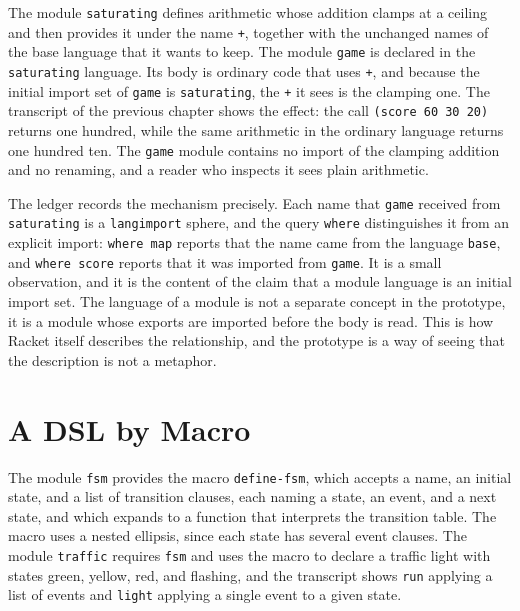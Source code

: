 The module \texttt{saturating} defines arithmetic whose addition clamps at a ceiling and then provides it under the name \texttt{+}, together with the unchanged names of the base language that it wants to keep. The module \texttt{game} is declared in the \texttt{saturating} language. Its body is ordinary code that uses \texttt{+}, and because the initial import set of \texttt{game} is \texttt{saturating}, the \texttt{+} it sees is the clamping one. The transcript of the previous chapter shows the effect: the call \texttt{(score 60 30 20)} returns one hundred, while the same arithmetic in the ordinary language returns one hundred ten. The \texttt{game} module contains no import of the clamping addition and no renaming, and a reader who inspects it sees plain arithmetic.

The ledger records the mechanism precisely. Each name that \texttt{game} received from \texttt{saturating} is a \texttt{langimport} sphere, and the query \texttt{where} distinguishes it from an explicit import: \texttt{where map} reports that the name came from the language \texttt{base}, and \texttt{where score} reports that it was imported from \texttt{game}. It is a small observation, and it is the content of the claim that a module language is an initial import set. The language of a module is not a separate concept in the prototype, it is a module whose exports are imported before the body is read. This is how Racket itself describes the relationship, and the prototype is a way of seeing that the description is not a metaphor.

\section{A DSL by Macro}

The module \texttt{fsm} provides the macro \texttt{define-fsm}, which accepts a name, an initial state, and a list of transition clauses, each naming a state, an event, and a next state, and which expands to a function that interprets the transition table. The macro uses a nested ellipsis, since each state has several event clauses. The module \texttt{traffic} requires \texttt{fsm} and uses the macro to declare a traffic light with states green, yellow, red, and flashing, and the transcript shows \texttt{run} applying a list of events and \texttt{light} applying a single event to a given state.

